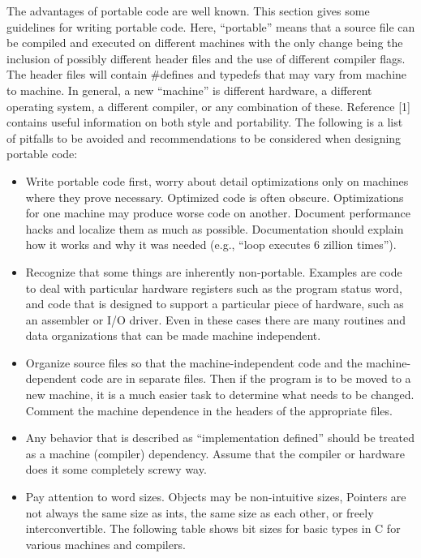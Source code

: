 \bigskip\noindent
 The advantages of portable code are well known. This section gives some
guidelines for writing portable code. Here, ``portable'' means that a source
file can be compiled and executed on different machines with the only change
being the inclusion of possibly different header files and the use of different
compiler flags. The header files will contain \#defines and typedefs that may
vary from machine to machine. In general, a new ``machine'' is different
hardware, a different operating system, a different compiler, or any
combination of these. Reference [1] contains useful information on both style
and portability. The following is a list of pitfalls to be avoided and
recommendations to be considered when designing portable code: 
\begin{itemize}
\item Write portable code first, worry about detail optimizations only on
machines where they  prove necessary. Optimized code is often obscure.
Optimizations for one machine may  produce worse code on another. Document
performance hacks and localize them as much  as possible. Documentation should
explain how it works and why it was needed (e.g.,  ``loop executes 6 zillion
times''). 

\item Recognize that some things are inherently non-portable. Examples are code
to deal with particular hardware registers such as the program status word,
and code that is designed to support a particular piece of hardware, such as
an assembler or I/O driver. Even in these cases there are many routines and
data organizations that can be made machine independent.

\item Organize source files so that the machine-independent code and the
machine-de\-pend\-ent code are in separate files. Then if the program is to be
moved to a new machine, it is a much easier task to determine what needs to be
changed. Comment the machine dependence in the headers of the appropriate
files.

\item Any behavior that is described as ``implementation defined'' should be
treated as a machine (compiler) dependency. Assume that the compiler or
hardware does it some completely screwy way. 

\item Pay attention to word sizes. Objects may be non-intuitive sizes, Pointers
are not always the same size as ints, the same size as each other, or freely
interconvertible. The following table shows bit sizes for basic types in C
for various machines and compilers.


\end{itemize}
